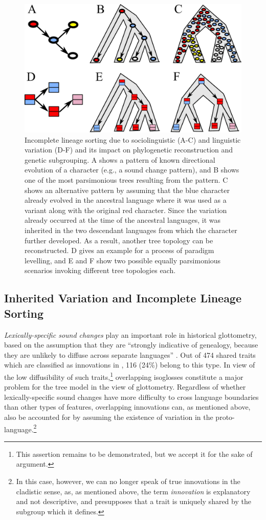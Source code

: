\documentclass[svgnames,12pt]{scrartcl}
\begin{document}
{{\begin{figure}[htb]
  \centering
  \includegraphics[width=\textwidth]{images/ils.pdf}
  \caption{Incomplete lineage sorting due to sociolinguistic (A-C) and linguistic variation (D-F)
  and its impact   on phylogenetic reconstruction and genetic subgrouping. A shows a pattern of
  known directional   evolution of a character (e.g., a sound change pattern), and B shows one of
  the most parsimonious trees resulting from the pattern. C shows an alternative pattern by assuming
  that the blue   character already evolved in the ancestral language where it was used as a variant
  along with the original red character. Since the variation already occurred at the time of the
  ancestral languages, it was inherited in the two descendant languages from which the character
  further developed. As a result, another tree topology can be reconstructed. D gives an example for
  a process of paradigm levelling, and E and F show two possible equally parsimonious scenarios
  invoking different tree topologies each.}
  \label{fig:ils}
\end{figure}
 
\subsection{Inherited Variation and Incomplete Lineage Sorting}\label{sec:ils}
\textit{Lexically-specific sound changes} play an important role in historical glottometry, based on
the assumption that they are ``strongly indicative of genealogy, because they are unlikely to
diffuse across separate languages'' \citep[178]{Francois2014}. Out of 474 shared traits which are
classified as innovations in \citet{Francois2014}, 116 (24\%) belong to this type. In view of the
low diffusibility of such traits,\footnote{This assertion remains to be demonstrated, but we accept
it for the sake of argument.} overlapping isoglosses constitute a major problem for the tree model
in the view of glottometry. Regardless of whether lexically-specific sound changes have more
difficulty to cross language boundaries than other types of features, overlapping innovations can,
as mentioned above, also be accounted for by assuming the existence of variation in the
proto-language.\footnote{In this case, however, we can no longer speak of true innovations in the
cladistic sense, as, as mentioned above, the term \emph{innovation} is explanatory and not descriptive,
and presupposes that a trait is uniquely shared by the subgroup which it defines.}

}}
\end{document}
